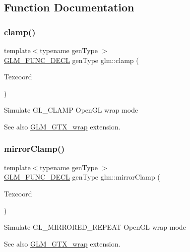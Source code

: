 \subsection{Function Documentation}
\mbox{\label{group__gtx__wrap_ga6c0cc6bd1d67ea1008d2592e998bad33}} 
\subsubsection{\texorpdfstring{clamp()}{clamp()}}
{\footnotesize\ttfamily template$<$typename gen\+Type $>$ \\
\mbox{\hyperlink{setup_8hpp_ab2d052de21a70539923e9bcbf6e83a51}{G\+L\+M\+\_\+\+F\+U\+N\+C\+\_\+\+D\+E\+CL}} gen\+Type glm\+::clamp (\begin{DoxyParamCaption}\item[{gen\+Type const \&}]{Texcoord }\end{DoxyParamCaption})}

Simulate G\+L\+\_\+\+C\+L\+A\+MP Open\+GL wrap mode \begin{DoxySeeAlso}{See also}
\mbox{\hyperlink{group__gtx__wrap}{G\+L\+M\+\_\+\+G\+T\+X\+\_\+wrap}} extension. 
\end{DoxySeeAlso}
\mbox{\label{group__gtx__wrap_gaa6856a0a048d2749252848da35e10c8b}} 
\subsubsection{\texorpdfstring{mirror\+Clamp()}{mirrorClamp()}}
{\footnotesize\ttfamily template$<$typename gen\+Type $>$ \\
\mbox{\hyperlink{setup_8hpp_ab2d052de21a70539923e9bcbf6e83a51}{G\+L\+M\+\_\+\+F\+U\+N\+C\+\_\+\+D\+E\+CL}} gen\+Type glm\+::mirror\+Clamp (\begin{DoxyParamCaption}\item[{gen\+Type const \&}]{Texcoord }\end{DoxyParamCaption})}

Simulate G\+L\+\_\+\+M\+I\+R\+R\+O\+R\+E\+D\+\_\+\+R\+E\+P\+E\+AT Open\+GL wrap mode \begin{DoxySeeAlso}{See also}
\mbox{\hyperlink{group__gtx__wrap}{G\+L\+M\+\_\+\+G\+T\+X\+\_\+wrap}} extension. 
\end{DoxySeeAlso}
\mbox{\label{group__gtx__wrap_ga16a89b0661b60d5bea85137bbae74d73}} 
